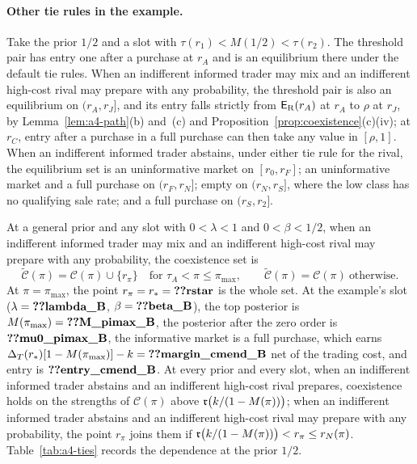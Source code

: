 \paragraph{Other tie rules in the example.}
Take the prior \(1/2\) and a slot with \(\tau(r_1)<M(1/2)<\tau(r_2)\). The threshold pair has entry one after a
purchase at \(r_A\) and is an equilibrium there under the default tie rules. When an indifferent informed trader may mix and
an indifferent high-cost rival may prepare with any probability, the threshold pair is also an equilibrium on
\((r_A,r_J]\), and its entry falls strictly from \(\mathsf{E}_{\rm R}(r_A)\) at \(r_A\) to \(\rho\) at \(r_J\), by
Lemma~\ref{lem:a4-path}(b) and~(c) and Proposition~\ref{prop:coexistence}(c)(iv); at \(r_C\), entry after a purchase in
a full purchase can then take any value in \([\rho,1]\). When an indifferent informed trader abstains, under either tie rule for the rival, the equilibrium set is an uninformative market on \([r_0,r_F]\); an uninformative market and a full purchase on
\((r_F,r_N]\); empty on \((r_N,r_S]\), where the low class has no qualifying sale rate; and a full purchase on
\((r_S,r_2]\).

At a general prior and any slot with \(0<\lambda<1\) and \(0<\beta<1/2\), when an indifferent informed trader may mix and an
indifferent high-cost rival may prepare with any probability, the coexistence set is
\[
\widetilde{\mathcal C}(\pi)=\mathcal C(\pi)\cup\{r_\pi\}\quad\text{for }\tau_A<\pi\le\pi_{\max},\qquad
\widetilde{\mathcal C}(\pi)=\mathcal C(\pi)\ \text{otherwise}.
\]
At \(\pi=\pi_{\max}\), the point \(r_\pi=r_*=\reg{rstar}\) is the whole set. At the example's slot
(\(\lambda=\reg{lambda_B}\), \(\beta=\reg{beta_B}\)), the top posterior is \(M(\pi_{\max})=\reg{M_pimax_B}\), the
posterior after the zero order is \(\reg{mu0_pimax_B}\), the informative market is a full purchase, which earns
\(\DT(r_*)[1-M(\pi_{\max})]-k=\reg{margin_cmend_B}\) net of the trading cost, and entry is \(\reg{entry_cmend_B}\). At every
prior and every slot, when an indifferent informed trader abstains and an indifferent high-cost rival prepares,
coexistence holds on the strengths of \(\mathcal C(\pi)\) above \(\mathfrak{r}\bigl(k/(1-M(\pi))\bigr)\); when an indifferent
informed trader abstains and an indifferent high-cost rival may prepare with any probability, the point \(r_\pi\) joins
them if \(\mathfrak{r}\bigl(k/(1-M(\pi))\bigr)<r_\pi\le r_N(\pi)\). Table~\ref{tab:a4-ties} records the dependence at the
prior \(1/2\).

